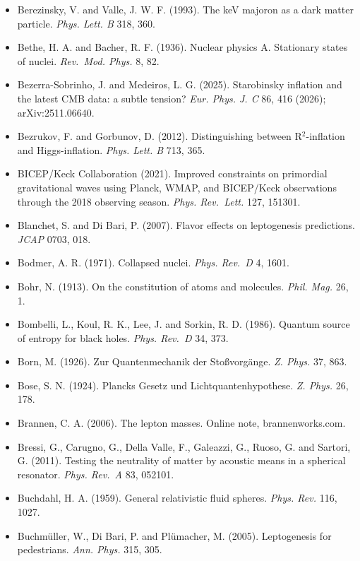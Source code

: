 \documentclass[
  11pt,
]{article}
\begin{document}
\begin{itemize}
  Bell, J. S. and Sutherland, D. G. (1968). Current algebra and \ensuremath{\eta} \ensuremath{\to} 3\ensuremath{\pi}. \emph{Nucl. Phys. B} 4, 315.
\item
  Berezinsky, V. and Valle, J. W. F. (1993). The keV majoron as a dark matter particle. \emph{Phys. Lett. B} 318, 360.
\item
  Bethe, H. A. and Bacher, R. F. (1936). Nuclear physics A. Stationary states of nuclei. \emph{Rev.~Mod. Phys.} 8, 82.
\item
  Bezerra-Sobrinho, J. and Medeiros, L. G. (2025). Starobinsky inflation and the latest CMB data: a subtle tension? \emph{Eur. Phys. J. C} 86, 416 (2026); arXiv:2511.06640.
\item
  Bezrukov, F. and Gorbunov, D. (2012). Distinguishing between R\ensuremath{^{2}}-inflation and Higgs-inflation. \emph{Phys. Lett. B} 713, 365.
\item
  BICEP/Keck Collaboration (2021). Improved constraints on primordial gravitational waves using Planck, WMAP, and BICEP/Keck observations through the 2018 observing season. \emph{Phys. Rev.~Lett.} 127, 151301.
\item
  Blanchet, S. and Di Bari, P. (2007). Flavor effects on leptogenesis predictions. \emph{JCAP} 0703, 018.
\item
  Bodmer, A. R. (1971). Collapsed nuclei. \emph{Phys. Rev.~D} 4, 1601.
\item
  Bohr, N. (1913). On the constitution of atoms and molecules. \emph{Phil. Mag.} 26, 1.
\item
  Bombelli, L., Koul, R. K., Lee, J. and Sorkin, R. D. (1986). Quantum source of entropy for black holes. \emph{Phys. Rev.~D} 34, 373.
\item
  Born, M. (1926). Zur Quantenmechanik der Stoßvorgänge. \emph{Z. Phys.} 37, 863.
\item
  Bose, S. N. (1924). Plancks Gesetz und Lichtquantenhypothese. \emph{Z. Phys.} 26, 178.
\item
  Brannen, C. A. (2006). The lepton masses. Online note, brannenworks.com.
\item
  Bressi, G., Carugno, G., Della Valle, F., Galeazzi, G., Ruoso, G. and Sartori, G. (2011). Testing the neutrality of matter by acoustic means in a spherical resonator. \emph{Phys. Rev.~A} 83, 052101.
\item
  Buchdahl, H. A. (1959). General relativistic fluid spheres. \emph{Phys. Rev.} 116, 1027.
\item
  Buchmüller, W., Di Bari, P. and Plümacher, M. (2005). Leptogenesis for pedestrians. \emph{Ann. Phys.} 315, 305.

\end{itemize}
\end{document}

